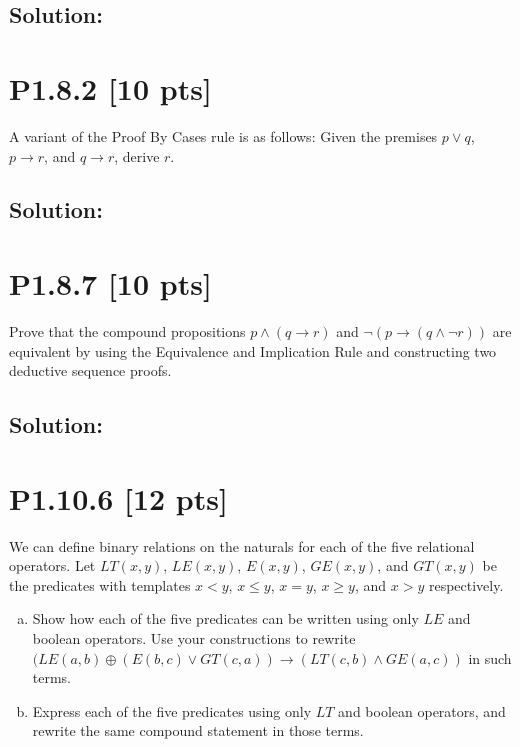 \documentclass[12pt]{article}
\begin{document}
\subsection*{\textbf{Solution:}}



\newpage



\newpage
\section*{\textbf{P1.8.2} [10 pts]}
A variant of the Proof By Cases rule is as follows: Given the premises $p \lor q$, $p \rightarrow r$, and $q \rightarrow r$, derive $r$.


\subsection*{\textbf{Solution:}}




\newpage
\section*{\textbf{P1.8.7} [10 pts]}
Prove that the compound propositions $p \land (q \rightarrow r)$ and $\neg (p \rightarrow (q \land \neg r))$ are equivalent by using the Equivalence and Implication Rule and constructing two deductive sequence proofs.



\subsection*{\textbf{Solution:}}



\newpage
\section*{\textbf{P1.10.6} [12 pts]}
We can define binary relations on the naturals for each of the five relational operators. Let $LT(x, y)$, $LE(x, y)$, $E(x, y)$, $GE(x, y)$, and $GT(x, y)$ be the predicates with templates $x < y$, $x \leq y$, $x = y$, $x \geq y$, and $x > y$ respectively.

\begin{enumerate}[(a)]
    \item Show how each of the five predicates can be written using only $LE$ and boolean operators. Use your constructions to rewrite $(LE(a, b) \oplus (E(b, c) \lor GT(c, a)) \rightarrow (LT(c, b) \land GE(a, c))$ in such terms.

    \item Express each of the five predicates using only $LT$ and boolean operators, and rewrite the same compound statement in those terms.
\end{enumerate}
\end{document}
